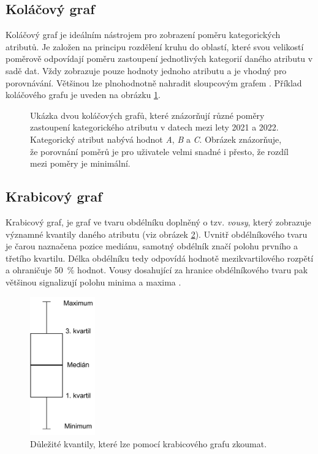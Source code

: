 \subsection*{Koláčový graf}

Koláčový graf je ideálním nástrojem pro zobrazení poměru kategorických atributů. Je založen na principu rozdělení kruhu do oblastí, které svou velikostí poměrově odpovídají poměru zastoupení jednotlivých kategorií daného atributu v sadě dat. Vždy zobrazuje pouze hodnoty jednoho atributu a je vhodný pro porovnávání. Většinou lze plnohodnotně nahradit sloupcovým grafem \cite{skiena}. Příklad koláčového grafu je uveden na obrázku \ref{pie_plots}.
 
\begin{figure}[h]
	\centering
	\resizebox{0.75\textwidth}{!}
    {
        
    }
	\caption{Ukázka dvou koláčových grafů, které znázorňují různé poměry zastoupení kategorického atributu v datech mezi lety 2021 a 2022. Kategorický atribut nabývá hodnot \emph{A}, \emph{B} a \emph{C}. Obrázek znázorňuje, že porovnání poměrů je pro uživatele velmi snadné i přesto, že rozdíl mezi poměry je minimální.}
	\label{pie_plots}
\end{figure}

\subsection*{Krabicový graf}


Krabicový graf, je graf ve tvaru obdélníku doplněný o tzv. \emph{vousy}, který zobrazuje významné kvantily daného atributu (viz obrázek \ref{box_plot}). Uvnitř obdélníkového tvaru je čarou naznačena pozice mediánu, samotný obdélník značí polohu prvního a třetího kvartilu. Délka obdélníku tedy odpovídá hodnotě mezikvartilového rozpětí a ohraničuje 50~\% hodnot. Vousy dosahující za hranice obdélníkového tvaru pak většinou signalizují polohu minima a maxima \cite{biostatistika}.


\begin{figure}[h]
	\centering
	\includegraphics[width=0.25\textwidth]{obrazky-figures/box_plot.pdf}
	\caption{Důležité kvantily, které lze pomocí krabicového grafu zkoumat.}
	\label{box_plot}
\end{figure}


